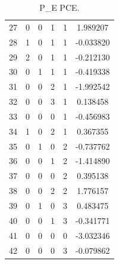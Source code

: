 \documentclass[preprint,12pt]{elsarticle}
\begin{document}
\begin{table}[h!]
\begin{minipage}[h!]{0.23\textwidth}
{\begin{tabular}{|c|ccccc|}
27 &   0 &   0 &   1 &   1 &    1.989207 \\
28 &   1 &   0 &   1 &   1 &   -0.033820 \\
29 &   2 &   0 &   1 &   1 &   -0.212130 \\
30 &   0 &   1 &   1 &   1 &   -0.419338 \\
31 &   0 &   0 &   2 &   1 &   -1.992542 \\
32 &   0 &   0 &   3 &   1 &    0.138458 \\
33 &   0 &   0 &   0 &   1 &   -0.456983 \\
34 &   1 &   0 &   2 &   1 &    0.367355 \\
35 &   0 &   1 &   0 &   2 &   -0.737762 \\
36 &   0 &   0 &   1 &   2 &   -1.414890 \\
37 &   0 &   0 &   0 &   2 &    0.395138 \\
38 &   0 &   0 &   2 &   2 &    1.776157 \\
39 &   0 &   1 &   0 &   3 &    0.483475 \\
40 &   0 &   0 &   1 &   3 &   -0.341771 \\
41 &   0 &   0 &   0 &   0 &   -3.032346 \\
42 &   0 &   0 &   0 &   3 &   -0.079862 \\
\hline
\end{tabular}}
\caption{\tiny P\_E PCE.}
\end{minipage}%
%
\begin{minipage}[h!]{0.23\textwidth}
\end{minipage}
\end{table}
\end{document}
